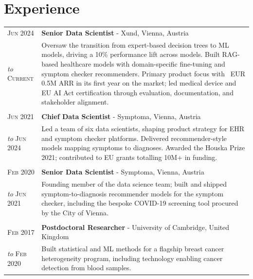 \section{Experience}
\begin{tabular}{>{\raggedleft}p{2.15cm}|p{12cm}}

	\textsc{Jun 2024} &  \textbf{Senior Data Scientist} - Xund, Vienna, Austria \\
	\emph{to} \textsc{Current} & Oversaw the transition from expert-based decision trees to ML models, driving a 10\% performance lift across models. Built RAG-based healthcare models with domain-specific fine-tuning and symptom checker recommenders. Primary product focus with ~EUR 0.5M ARR in its first year on the market; led medical device and EU AI Act certification through evaluation, documentation, and stakeholder alignment. \\
	\multicolumn{2}{c}{}\\

	\textsc{Jun 2021} &  \textbf{Chief Data Scientist} - Symptoma, Vienna, Austria \\
	\emph{to} \textsc{Jun 2024} & Led a team of six data scientists, shaping product strategy for EHR and symptom checker platforms. Delivered recommender-style models mapping symptoms to diagnoses. Awarded the Houska Prize 2021; contributed to EU grants totalling 10M+ in funding. \\

	\multicolumn{2}{c}{}\\

	\textsc{Feb 2020} & \textbf{Senior Data Scientist} - Symptoma, Vienna, Austria \\
	\emph{to} \textsc{Jun 2021} & Founding member of the data science team; built and shipped symptom-to-diagnosis recommender models for the symptom checker, including the bespoke COVID-19 screening tool procured by the City of Vienna. \\
	\multicolumn{2}{c}{}\\


	\textsc{Feb 2017} &  \textbf{Postdoctoral Researcher} - University of Cambridge, United Kingdom\\
	\emph{to} \textsc{Feb 2020} & Built statistical and ML methods for a flagship breast cancer heterogeneity program, including technology enabling cancer detection from blood samples. \\



\end{tabular}

